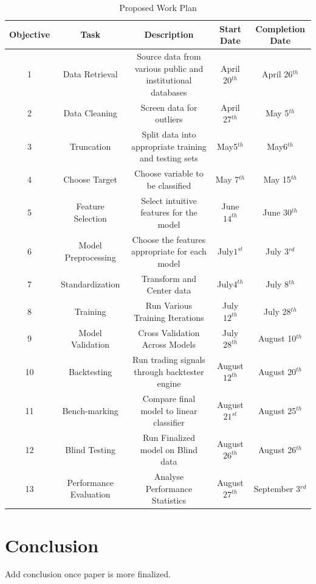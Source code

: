 \documentclass[12pt, a4paper]{article}
\begin{document}
\begin{table} \caption{Proposed Work Plan} %
\centering      %
\begin{tabular}{c c c c c}  %
\hline                     %
Objective & Task &   Description                                                                        & Start Date          & Completion Date \\ [0.5ex] %
 \hline                    %
1 & Data Retrieval  & Source data from various public and institutional databases & April 20$^{th}$ & April 26$^{th}$\\   %
2  & Data Cleaning  & Screen data for outliers                                                     & April 27$^{th}$ & May 5$^{th}$ \\ 
3  & Truncation  & Split data into appropriate training and testing sets                 & May5$^{th}$ & May6$^{th}$ \\ 
4 & Choose Target & Choose variable to be classified                                          & May 7$^{th}$ & May 15$^{th}$\\ 
5 & Feature Selection & Select intuitive features for the model                            & June$14^{th}$ & June 30$^{th}$\\ 
6 & Model Preprocessing & Choose the features appropriate for each model        & July$1^{st}$ & July 3$^{rd}$\\
7 & Standardization & Transform and Center data                                              & July$4^{th}$ & July 8$^{th}$ \\
8 & Training & Run Various Training Iterations                                                   &  July$12^{th}$ & July 28$^{th}$ \\
9 & Model Validation & Cross Validation Across Models                                      & July$28^{th}$ & August 10$^{th}$ \\
10 & Backtesting & Run trading signals through backtester engine                      &  August$12^{th}$ & August 20$^{th}$ \\
11 & Bench-marking & Compare final model to linear classifier                           & August$21^{st}$ & August 25$^{th}$ \\
12 & Blind Testing & Run Finalized model on Blind data                                    & August$26^{th}$ & August 26$^{th}$\\
13 & Performance Evaluation & Analyse Performance Statistics                         & August$27^{th}$ & September 3$^{rd}$\\ [1ex]       %
\hline     %
\end{tabular} \label{table:nonlin}  %
\end{table} 
\clearpage

\section{Conclusion}
Add conclusion once paper is more finalized.

{}
\clearpage
\end{document}
